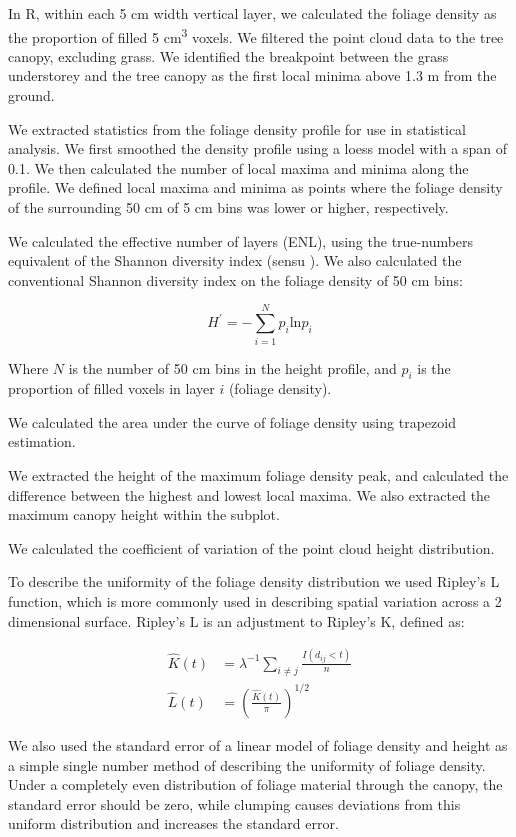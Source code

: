 \documentclass[11pt,a4paper]{article}
\begin{document}
In R, within each 5 cm width vertical layer, we calculated the foliage density as the proportion of filled 5 cm\textsuperscript{3} voxels. We filtered the point cloud data to the tree canopy, excluding grass. We identified the breakpoint between the grass understorey and the tree canopy as the first local minima above 1.3 m from the ground. 

We extracted statistics from the foliage density profile for use in statistical analysis. We first smoothed the density profile using a loess model with a span of 0.1. We then calculated the number of local maxima and minima along the profile. We defined local maxima and minima as points where the foliage density of the surrounding 50 cm of 5 cm bins was lower or higher, respectively.

We calculated the effective number of layers (ENL), using the true-numbers equivalent of the Shannon diversity index (sensu \citep{Ehbrecht2016}). We also calculated the conventional Shannon diversity index on the foliage density of 50 cm bins:

\begin{equation}
	H^{\prime{}} = - \sum_{i=1}^{N} p_{i} \text{ln} p_{i}
\end{equation}

Where $N$ is the number of 50 cm bins in the height profile, and $p_{i}$ is the proportion of filled voxels in layer $i$ (foliage density).

We calculated the area under the curve of foliage density using trapezoid estimation.

We extracted the height of the maximum foliage density peak, and calculated the difference between the highest and lowest local maxima. We also extracted the maximum canopy height within the subplot.

We calculated the coefficient of variation of the point cloud height distribution.

To describe the uniformity of the foliage density distribution we used Ripley's L function, which is more commonly used in describing spatial variation across a 2 dimensional surface. Ripley's L is an adjustment to Ripley's K, defined as:

\begin{align}
	\widehat{K}(t) &= \lambda^{-1} \sum_{i\neq{}j} \frac{I(d_{ij} < t)}{n} \\
	\widehat{L}(t) &= \left(\frac{\widehat{K}(t)}{\pi}\right)^{1/2}
\end{align}

We also used the standard error of a linear model of foliage density and height as a simple single number method of describing the uniformity of foliage density. Under a completely even distribution of foliage material through the canopy, the standard error should be zero, while clumping causes deviations from this uniform distribution and increases the standard error.
\end{document}
